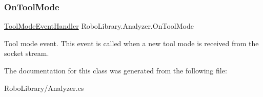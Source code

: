 \subsubsection{\texorpdfstring{On\+Tool\+Mode}{OnToolMode}}
{\footnotesize\ttfamily \hyperlink{class_robo_library_1_1_analyzer_a6d2960ef27111be171f8c9d6a7d2a058}{Tool\+Mode\+Event\+Handler} Robo\+Library.\+Analyzer.\+On\+Tool\+Mode\hspace{0.3cm}{\ttfamily [static]}}



Tool mode event. This event is called when a new tool mode is received from the socket stream.



The documentation for this class was generated from the following file\+:\begin{DoxyCompactItemize}
\item 
Robo\+Library/Analyzer.\+cs\end{DoxyCompactItemize}
